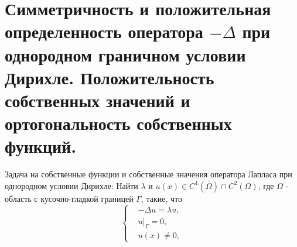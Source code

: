 \section{Симметричность и положительная определенность оператора $-\Delta$ при однородном граничном условии Дирихле. Положительность собственных значений и ортогональность собственных функций.}
Задача на собственные функции и собственные значения оператора Лапласа при однородном условии Дирихле:
Найти $\lambda$ и $u(x) \in C^1(\overline{\Omega}) \cap C^2(\Omega)$, где $\Omega$ - область с кусочно-гладкой границей $\Gamma$, такие, что
\[
\begin{cases}
&- \Delta u= \lambda u,\\
& u|_\Gamma=0,\\
& u(x) \neq 0,
\end{cases} 
\]

